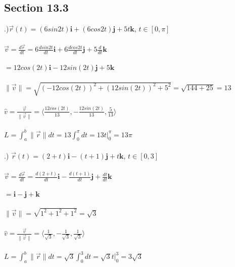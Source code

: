 \documentclass[12pt]{article}
\begin{document}
\subsection*{Section 13.3}
.)$\vec{r}(t) = (6sin{2t})\mathbf{i} + (6cos{2t})\mathbf{j} + 5t\mathbf{k}$, \hspace{10pt} $t \in [0, \pi]$\\\\
\noindent $\vec{v} = \frac{d\vec{r}}{dt} = 6\frac{dsin{2t}}{dt} \mathbf{i} + 6\frac{dcos{2t}}{dt}\mathbf{j} + 5\frac{d}{dt}\mathbf{k}$\\\\
\noindent $ = 12cos(2t)\mathbf{i} - 12sin(2t)\mathbf{j} + 5\mathbf{k}$\\\\
\noindent $\| \vec{v} \|  = \sqrt{(-12cos(2t))^{2} + (12sin(2t))^{2} + 5^{2}} = \sqrt{144 + 25} = 13$\\\\
\noindent $\hat{v} = \frac{\vec{v}}{\| \vec{v} \|} = \langle \frac{12cos(2t)}{13} , -\frac{12sin(2t)}{13}, \frac{5}{13} \rangle$\\\\
\noindent $L = \int_{a}^{b} \| \vec{r} \|  dt = 13\int_{0}^{\pi} dt = 13t\Big|_0^{\pi} = 13\pi$\\\\






.) $ \vec{r}(t) = (2 + t)\mathbf{i} - (t + 1)\mathbf{j} + t\mathbf{k}$, \hspace{10pt} $t \in [0, 3]$\\\\
\noindent $\vec{v} = \frac{d\vec{r}}{dt} = \frac{d(2 + t)}{dt}\mathbf{i} - \frac{d(t + 1)}{dt}\mathbf{j}  + \frac{dt}{dt}\mathbf{k}$\\\\
\noindent $ = \mathbf{i} -\mathbf{j} + \mathbf{k}$\\\\
\noindent $\| \vec{v} \|  = \sqrt{1^{2} + 1^{2} + 1^{2}} = \sqrt{3}$\\\\
\noindent $\hat{v} = \frac{\vec{v}}{\| \vec{v} \| } = \langle \frac{1}{\sqrt{3}}, -\frac{1}{\sqrt{3}}, \frac{1}{\sqrt{3}}\rangle$\\\\
\noindent $L = \int_{a}^{b} \| \vec{r} \|  dt = \sqrt{3}\int_{0}^{3} dt = \sqrt{3}t\Big|_0^3 = 3\sqrt{3}$\\\\
\end{document}
